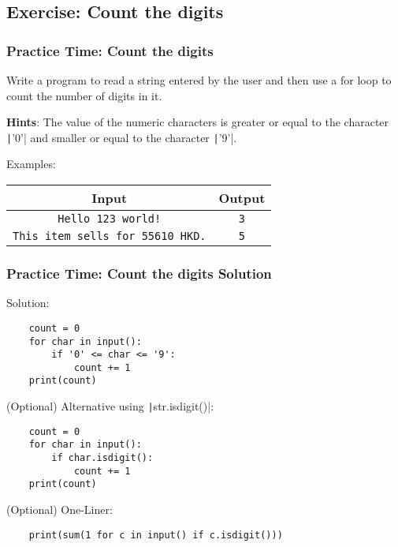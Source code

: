 \documentclass{beamer}
\begin{document}
\subsection{Exercise: Count the digits}
\begin{frame}[fragile]
    \frametitle{Practice Time: Count the digits}

    Write a program to read a string entered by the user and
    then use a for loop to count the number of digits in it.

    \textbf{Hints}: The value of the numeric characters is
    greater or equal to the character \texttt|'0'|
    and smaller or equal to the character \texttt|'9'|.

    Examples:

    \begin{tabular}{|c|c|}
        \hline
        Input                                   & Output     \\ \hline
        \texttt{Hello 123 world!}               & \texttt{3} \\ \hline
        \texttt{This item sells for 55610 HKD.} & \texttt{5} \\ \hline
    \end{tabular}
\end{frame}
\begin{frame}[fragile]
    \frametitle{Practice Time: Count the digits Solution}

    Solution:
    \begin{verbatim}
    count = 0
    for char in input():
        if '0' <= char <= '9':
            count += 1
    print(count)
    \end{verbatim}

    (Optional) Alternative using \texttt|str.isdigit()|:
    \begin{verbatim}
    count = 0
    for char in input():
        if char.isdigit():
            count += 1
    print(count)
    \end{verbatim}

    (Optional) One-Liner:
    \begin{verbatim}
    print(sum(1 for c in input() if c.isdigit()))
    \end{verbatim}
\end{frame}
\end{document}

